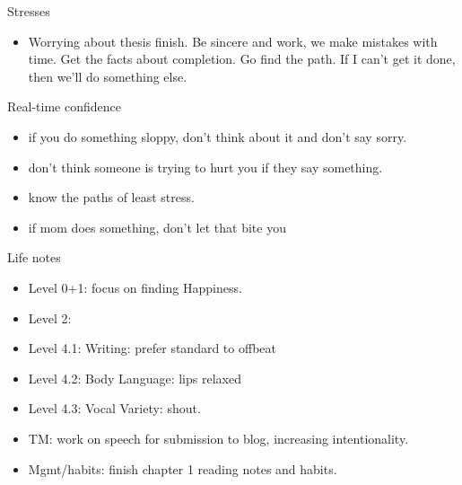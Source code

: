\documentclass[serif, mathserif, final]{beamer}
\begin{document}
\begin{frame}{} 
  \begin{columns}
    \begin{column}{0.25\linewidth} %
      \begin{block}{Stresses}
        \begin{itemize} 
        \item \tiny Worrying about thesis finish. Be sincere and work, we
          make mistakes with time. Get the facts about completion.  Go
          find the path. If I can't get it done, then we'll do something
          else. 
        \end{itemize} 
      \end{block} 

  \begin{block}{Real-time confidence}
    \begin{itemize} 
      \tiny \item \tiny if you do something sloppy, don't think about it and don't say sorry. 
    \item \tiny don't think someone is trying to hurt you if they say something.       
    \item \tiny know the paths of least stress. 
    \item \tiny if mom does something, don't let that bite you 
    \end{itemize} 
  \end{block} 

  \begin{block} {Life notes} 
    \begin{itemize} 
      \tiny \item \tiny Level 0+1: focus on finding Happiness. 
    \item \tiny Level 2: 
    \item \tiny Level 4.1: Writing: prefer standard to offbeat 
    \item \tiny Level 4.2: Body Language: lips relaxed
    \item \tiny Level 4.3: Vocal Variety: shout. 
    \item \tiny TM: work on speech for submission to blog, increasing intentionality. 
    \item \tiny Mgmt/habits: finish chapter 1 reading notes and habits. 
    \end{itemize}     
  \end{block} 
\end{column} %


\end{columns}
\end{frame}
\end{document}
